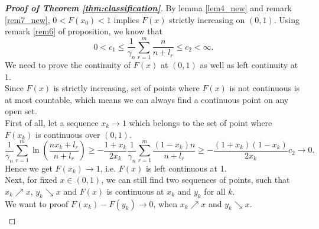 \documentclass[12pt]{article}
\theoremstyle{plain}
\theoremstyle{definition}
\theoremstyle{remark}
\begin{document}
\begin{proof}[\textit{\textbf{Proof of Theorem \ref{thm:classification}}}]
	By lemma \ref{lem4_new} and remark \ref{rem7_new}, $0<F(x_0)<1$ implies $F(x)$ strictly increasing on $(0,1)$. Using remark \ref{rem6} of proposition, we know that 
	\begin{equation*}
	0<c_1\leq \frac{1}{\gamma_{n}} \sum_{r=1}^{m} \frac{n}{n+l_{r}} %
	\leq c_2<\infty.
	\end{equation*}
	 We need to prove the continuity of $F(x)$ at $(0,1)$ as well as left continuity at $1$.\\
	 Since $F(x)$ is strictly increasing, set of points where $F(x)$ is not continuous is at most countable, which means we can always find a continuous point on any open set.\\
First of all, let a sequence $x_k\to 1$ which belongs to the set of point where $F(x_k)$ is continuous over $(0,1)$. 
\begin{equation*}
 \frac{1}{\gamma_{n}} \sum_{r=1}^{m} \ln \left(\frac{n x_k+l_{r}}{n+l_{r}}\right)\geq -\frac{1+x_k}{2 x_k} \frac{1}{\gamma_{n}} \sum_{r=1}^{m} \frac{(1-x_k) n}{n+l_{r}} \geq -\frac{(1+x_k)(1-x_k)}{2x_k}c_2\to 0.
\end{equation*}
Hence we get $F(x_k)\to 1$, i.e. $F(x)$ is left continuous at 1.\\
Next, for fixed $x\in (0,1)$, we can still find two sequences of points, such that $x_k\nearrow x$, $y_k\searrow x$ and $F(x)$ is continuous at $x_k$ and $y_k$ for all $k$.\\
We want to proof $F(x_k)-F(y_k)\to 0$, when $x_k\nearrow x$ and $y_k\searrow x$.\\
\begin{eqnarray*}

\end{eqnarray*}
\end{proof}
\end{document}

